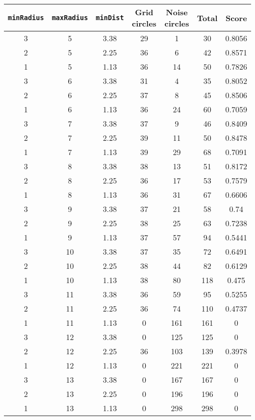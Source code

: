 \documentclass[letterpaper, 12pt]{article}
\begin{document}
\begin{longtable}{|c|c|c|c|c|c|c|}
\hline
\textbf{\texttt{minRadius}} & \textbf{\texttt{maxRadius}} & \textbf{\texttt{minDist}} & \textbf{Grid circles} & \textbf{Noise circles} & \textbf{Total} & \textbf{Score} \\
\hline
3 & 5 & 3.38 & 29 & 1 & 30 & 0.8056 \\
\hline
2 & 5 & 2.25 & 36 & 6 & 42 & 0.8571 \\
\hline
1 & 5 & 1.13 & 36 & 14 & 50 & 0.7826 \\
\hline
3 & 6 & 3.38 & 31 & 4 & 35 & 0.8052 \\
\hline
2 & 6 & 2.25 & 37 & 8 & 45 & 0.8506 \\
\hline
1 & 6 & 1.13 & 36 & 24 & 60 & 0.7059 \\
\hline
3 & 7 & 3.38 & 37 & 9 & 46 & 0.8409 \\
\hline
2 & 7 & 2.25 & 39 & 11 & 50 & 0.8478 \\
\hline
1 & 7 & 1.13 & 39 & 29 & 68 & 0.7091 \\
\hline
3 & 8 & 3.38 & 38 & 13 & 51 & 0.8172 \\
\hline
2 & 8 & 2.25 & 36 & 17 & 53 & 0.7579 \\
\hline
1 & 8 & 1.13 & 36 & 31 & 67 & 0.6606 \\
\hline
3 & 9 & 3.38 & 37 & 21 & 58 & 0.74 \\
\hline
2 & 9 & 2.25 & 38 & 25 & 63 & 0.7238 \\
\hline
1 & 9 & 1.13 & 37 & 57 & 94 & 0.5441 \\
\hline
3 & 10 & 3.38 & 37 & 35 & 72 & 0.6491 \\
\hline
2 & 10 & 2.25 & 38 & 44 & 82 & 0.6129 \\
\hline
1 & 10 & 1.13 & 38 & 80 & 118 & 0.475 \\
\hline
3 & 11 & 3.38 & 36 & 59 & 95 & 0.5255 \\
\hline
2 & 11 & 2.25 & 36 & 74 & 110 & 0.4737 \\
\hline
1 & 11 & 1.13 & 0 & 161 & 161 & 0 \\
\hline
3 & 12 & 3.38 & 0 & 125 & 125 & 0 \\
\hline
2 & 12 & 2.25 & 36 & 103 & 139 & 0.3978 \\
\hline
1 & 12 & 1.13 & 0 & 221 & 221 & 0 \\
\hline
3 & 13 & 3.38 & 0 & 167 & 167 & 0 \\
\hline
2 & 13 & 2.25 & 0 & 196 & 196 & 0 \\
\hline
1 & 13 & 1.13 & 0 & 298 & 298 & 0 \\

\end{longtable}
\end{document}
